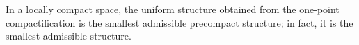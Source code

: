 In a locally compact space, the uniform structure obtained from the one-point compactification is the smallest admissible precompact structure; in fact, it is the smallest admissible structure.
